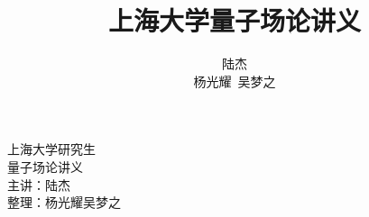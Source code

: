 \documentclass[a4paper]{article}
\title{上海大学量子场论讲义}
\author{陆杰\\杨光耀~吴梦之}
\begin{document}
    \begin{titlepage}
        \vspace*{144pt}
        \begin{center}
            \fontsize{36pt}{0} 上海大学研究生 \\
            \vspace*{36pt}
            \fontsize{36pt}{0} 量子场论讲义 \\
            \vspace*{64pt}
            \fontsize{20pt}{0} {主讲：陆杰} \\
            \vspace*{24pt}
            \fontsize{20pt}{0} {整理：杨光耀\quad 吴梦之}
        \end{center}
    \end{titlepage}

    \tableofcontents
    \clearpage

    
    
    
    
\end{document}
